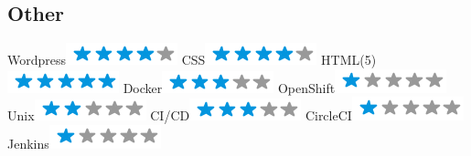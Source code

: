\begin{aside}
    \section{Other}
      Wordpress\includegraphics[scale=0.40]{img/4stars.png}
      CSS\includegraphics[scale=0.40]{img/4stars.png}
      HTML(5)\includegraphics[scale=0.40]{img/5stars.png}
      Docker\includegraphics[scale=0.40]{img/3stars.png}
      OpenShift\includegraphics[scale=0.40]{img/1stars.png}
      Unix\includegraphics[scale=0.40]{img/2stars.png}
      CI/CD\includegraphics[scale=0.40]{img/3stars.png}
      CircleCI\includegraphics[scale=0.40]{img/1stars.png}
      Jenkins\includegraphics[scale=0.40]{img/1stars.png}
  \end{aside}
